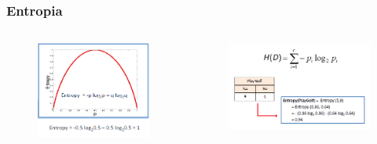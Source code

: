 \begin{frame}
	\frametitle{Entropia}
	
	\begin{columns}
	
			\begin{figure}[!htbp]
				\centering
				\includegraphics[width=1.00\linewidth]{images/supervised/decision_trees/entropy_1.png}
			\end{figure}
			
			
			
			\begin{figure}[!htbp]
				\centering
				\includegraphics[width=1.0\linewidth]{images/supervised/decision_trees/entropy_2.png}
			\end{figure}
			
	\end{columns}
\end{frame}

